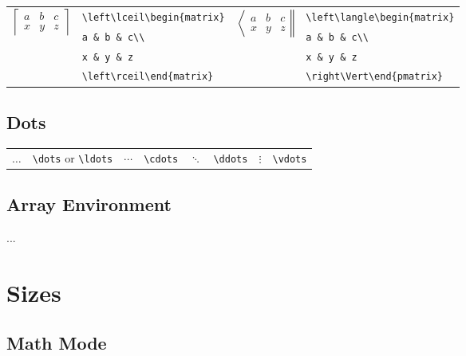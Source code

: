 \documentclass[10pt, english]{article}
\begin{document}
	\begin{center}
		\scriptsize
	\begin{tabular}{ll|ll}
		\multirow{4}{*}{$\left\lceil\begin{matrix}a&b&c\\x&y&z\end{matrix}\right\rceil$} & \verb|\left\lceil\begin{matrix}| & \multirow{4}{*}{$\left\langle\begin{matrix}a&b&c\\x&y&z\end{matrix}\right\Vert$} & \verb|\left\langle\begin{matrix}|\\
		& \verb|a & b & c\\| & & \verb|a & b & c\\|\\ 
		& \verb|x & y & z| & & \verb|x & y & z| \\
		& \verb|\left\rceil\end{matrix}| & & \verb|\right\Vert\end{pmatrix}|\\
	\end{tabular}
	\end{center}

	\subsection{Dots}

	\begin{center}
                \scriptsize
        \begin{tabular}{ll|ll|ll|ll}
                $\dots$ & \verb|\dots| or \verb|\ldots| & $\cdots$ & \verb|\cdots| & $\ddots$ & \verb|\ddots| & $\vdots$ & \verb|\vdots|\\
        \end{tabular}
        \end{center}

	\subsection{Array Environment}

	...

\section{Sizes}

	\subsection{Math Mode}
\end{document}
